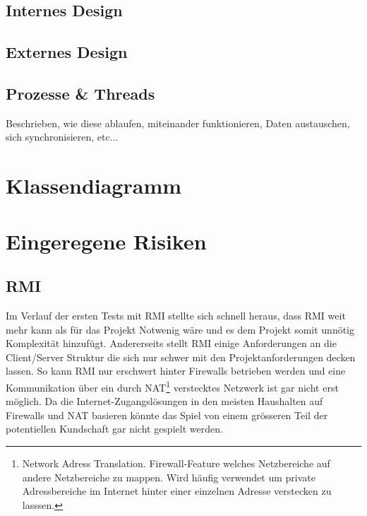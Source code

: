 \documentclass[a4paper,12pt,halfparskip,DIV14]{scrartcl}
\begin{document}
\subsection{Internes Design}\label{sub:internes_design} %


\subsection{Externes Design}\label{sub:externes_design} %


\subsection{Prozesse \& Threads} %
\label{sub:prozesse_threads}
Beschrieben, wie diese ablaufen, miteinander funktionieren, Daten austauschen, sich synchronisieren, etc...


\section{Klassendiagramm} %
\label{sec:klassendiagramm}


\section{Eingeregene Risiken} %
\label{sec:risiken}

\subsection{RMI} %
\label{sub:rmi}

Im Verlauf der ersten Tests mit RMI stellte sich schnell heraus, dass RMI weit mehr kann als für das Projekt Notwenig wäre und es dem Projekt somit unnötig Komplexität hinzufügt. Andererseits stellt RMI  einige Anforderungen an die Client/Server Struktur die sich nur schwer mit den Projektanforderungen decken lassen. So kann RMI nur erschwert hinter Firewalls betrieben werden und eine Kommunikation über ein durch NAT\footnote{Network Adress Translation. Firewall-Feature welches Netzbereiche auf andere Netzbereiche zu mappen. Wird häufig verwendet um private Adressbereiche im Internet hinter einer einzelnen Adresse verstecken zu lasssen.} verstecktes Netzwerk ist gar nicht erst möglich. Da die Internet-Zugangslösungen in den meisten Haushalten auf Firewalls und NAT basieren könnte das Spiel von einem grösseren Teil der potentiellen Kundschaft gar nicht gespielt werden.
\end{document}
